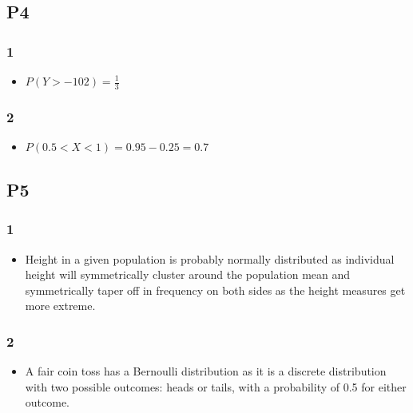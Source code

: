 \documentclass[
]{article}
\providecommand{\tightlist}{%
  \setlength{\itemsep}{0pt}\setlength{\parskip}{0pt}}
\begin{document}
\hypertarget{p4}{%
\subsection{P4}\label{p4}}

\hypertarget{section-5}{%
\subsubsection{1}\label{section-5}}

\begin{itemize}
\tightlist
\item
  \(P(Y>-102) = \frac{1}{3}\)
\end{itemize}

\hypertarget{section-6}{%
\subsubsection{2}\label{section-6}}

\begin{itemize}
\tightlist
\item
  \(P(0.5<X<1) = 0.95 - 0.25 = 0.7\)
\end{itemize}

\hypertarget{p5}{%
\subsection{P5}\label{p5}}

\hypertarget{section-7}{%
\subsubsection{1}\label{section-7}}

\begin{itemize}
\tightlist
\item
  Height in a given population is probably normally distributed as
  individual height will symmetrically cluster around the population
  mean and symmetrically taper off in frequency on both sides as the
  height measures get more extreme.
\end{itemize}

\hypertarget{section-8}{%
\subsubsection{2}\label{section-8}}

\begin{itemize}
\tightlist
\item
  A fair coin toss has a Bernoulli distribution as it is a discrete
  distribution with two possible outcomes: heads or tails, with a
  probability of 0.5 for either outcome.
\end{itemize}
\end{document}

